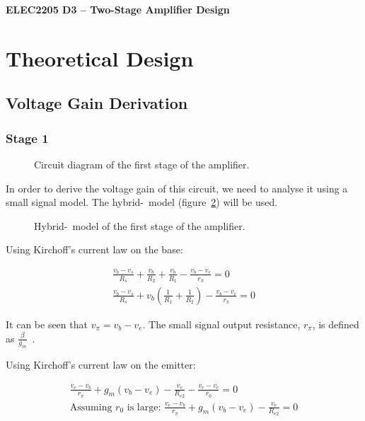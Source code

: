 \documentclass[a4paper,11pt]{article}
\begin{document}
  
\begin{center}
{\Large{\textbf{ELEC2205 D3 -- Two-Stage Amplifier Design}}} \\ [\baselineskip]

\end{center}

\begin{abstract}
\end{abstract}

\section{Theoretical Design}
\subsection{Voltage Gain Derivation}
\subsubsection{Stage 1}

\begin{figure}[h]
\centering
    
    \caption{Circuit diagram of the first stage of the amplifier.}
    \label{fig:stage1}
\end{figure}

In order to derive the voltage gain of this circuit, we need to analyse it using a small signal model. The hybrid-\textpi\ model (figure~\ref{fig:stage1hpi}) will be used.

\begin{figure}[h]
\centering
    
    \caption{Hybrid-\textpi\ model of the first stage of the amplifier.}
    \label{fig:stage1hpi}
\end{figure}

Using Kirchoff's current law on the base:

\begin{gather*}
\frac{v_b - v_s}{R_s} + \frac{v_b}{R_2} + \frac{v_b}{R_1} - \frac{v_b - v_e}{r_\pi} = 0\\
\frac{v_b - v_s}{R_s} + v_b \left(\frac{1}{R_1} + \frac{1}{R_2} \right) - \frac{v_b - v_e}{r_\pi} = 0
\end{gather*}

It can be seen that $v_\pi = v_b - v_e$. The small signal output resistance, $r_\pi$, is defined as $\frac{\beta}{g_m}$~\cite[p. 29]{ADAIC}.

Using Kirchoff's current law on the emitter:

\begin{gather*}
\frac{v_e - v_b}{r_\pi} + g_m (v_b - v_e) - \frac{v_e}{R_{e2}} - \frac{v_e - v_c}{r_0} = 0\\
\textrm{Assuming $r_0$ is large: } \frac{v_e - v_b}{r_\pi} + g_m (v_b - v_e) - \frac{v_e}{R_{e2}} = 0
\end{gather*}
\end{document}
